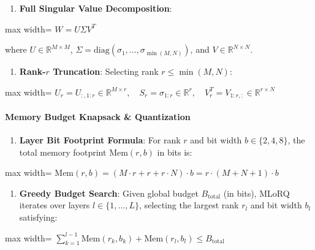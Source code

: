\begin{enumerate}
\item \textbf{Full Singular Value Decomposition}:
\end{enumerate}
\begin{center}
\begin{adjustbox}{max width=\columnwidth}
$\displaystyle
W = U \Sigma V^T
$
\end{adjustbox}
\end{center}
where $U \in \mathbb{R}^{M \times M}$, $\Sigma = \text{diag}(\sigma_1, \dots, \sigma_{\min(M, N)})$, and $V \in \mathbb{R}^{N \times N}$.

\begin{enumerate}
\item \textbf{Rank-$r$ Truncation}:
Selecting rank $r \le \min(M, N)$:
\end{enumerate}
\begin{center}
\begin{adjustbox}{max width=\columnwidth}
$\displaystyle
U_r = U_{:, 1:r} \in \mathbb{R}^{M \times r}, \quad S_r = \sigma_{1:r} \in \mathbb{R}^r, \quad V_r^T = V_{1:r, :} \in \mathbb{R}^{r \times N}
$
\end{adjustbox}
\end{center}

\paragraph{Memory Budget Knapsack \& Quantization}

\begin{enumerate}
\item \textbf{Layer Bit Footprint Formula}:
For rank $r$ and bit width $b \in \{2, 4, 8\}$, the total memory footprint $\text{Mem}(r, b)$ in bits is:
\end{enumerate}
\begin{center}
\begin{adjustbox}{max width=\columnwidth}
$\displaystyle
\text{Mem}(r, b) = (M \cdot r + r + r \cdot N) \cdot b = r \cdot (M + N + 1) \cdot b
$
\end{adjustbox}
\end{center}

\begin{enumerate}
\item \textbf{Greedy Budget Search}:
Given global budget $B_{\text{total}}$ (in bits), MLoRQ iterates over layers $l \in \{1, \dots, L\}$, selecting the largest rank $r_l$ and bit width $b_l$ satisfying:
\end{enumerate}
\begin{center}
\begin{adjustbox}{max width=\columnwidth}
$\displaystyle
\sum_{k=1}^{l-1} \text{Mem}(r_k, b_k) + \text{Mem}(r_l, b_l) \le B_{\text{total}}
$
\end{adjustbox}
\end{center}

